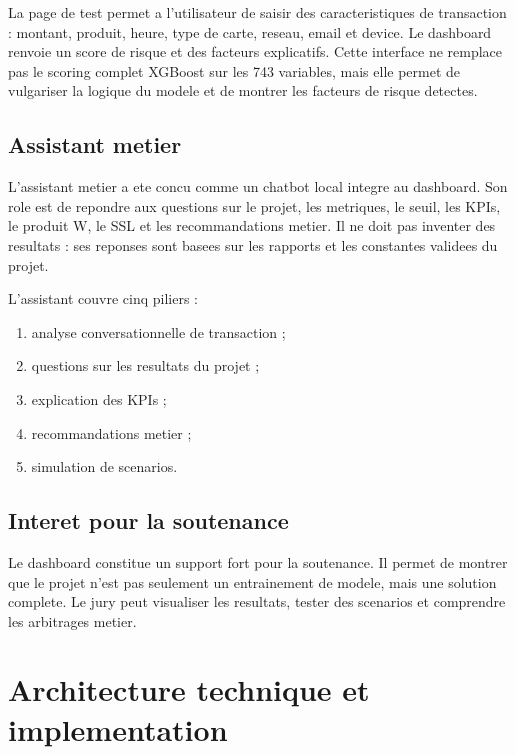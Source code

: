 ﻿\documentclass[12pt,a4paper,oneside]{report}
\begin{document}
La page de test permet a l'utilisateur de saisir des caracteristiques de transaction : montant, produit, heure, type de carte, reseau, email et device. Le dashboard renvoie un score de risque et des facteurs explicatifs. Cette interface ne remplace pas le scoring complet XGBoost sur les 743 variables, mais elle permet de vulgariser la logique du modele et de montrer les facteurs de risque detectes.

\section{Assistant metier}

L'assistant metier a ete concu comme un chatbot local integre au dashboard. Son role est de repondre aux questions sur le projet, les metriques, le seuil, les KPIs, le produit W, le SSL et les recommandations metier. Il ne doit pas inventer des resultats : ses reponses sont basees sur les rapports et les constantes validees du projet.

L'assistant couvre cinq piliers :

\begin{enumerate}
    \item analyse conversationnelle de transaction ;
    \item questions sur les resultats du projet ;
    \item explication des KPIs ;
    \item recommandations metier ;
    \item simulation de scenarios.
\end{enumerate}

\section{Interet pour la soutenance}

Le dashboard constitue un support fort pour la soutenance. Il permet de montrer que le projet n'est pas seulement un entrainement de modele, mais une solution complete. Le jury peut visualiser les resultats, tester des scenarios et comprendre les arbitrages metier.

\chapter{Architecture technique et implementation}
\end{document}
